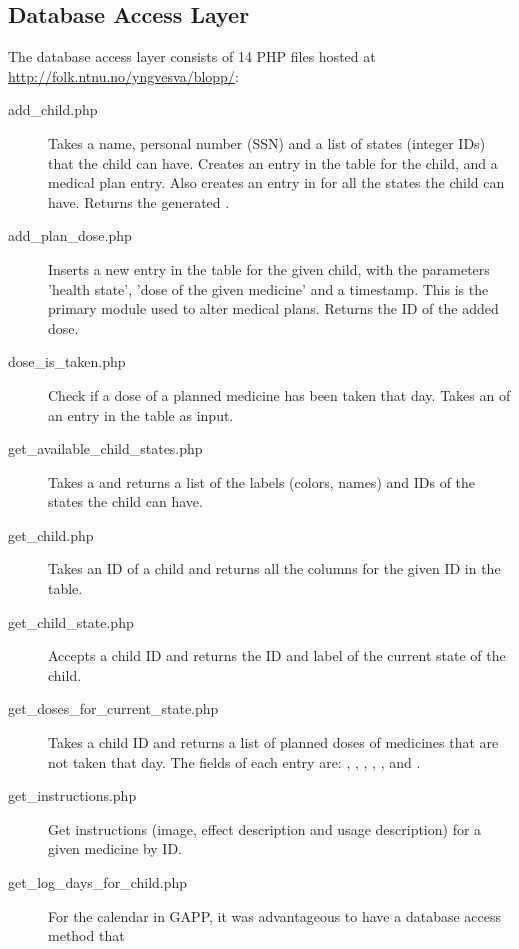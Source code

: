 \subsection{Database Access Layer}
\label{sec:databaseAccessLayer}
The database access layer consists of 14 PHP files hosted at			%
\url{http://folk.ntnu.no/yngvesva/blopp/}:
\begin{description}
    \item[add\_child.php] Takes a name, personal number (SSN) and a list of states (integer IDs) that the child can have. 
    	Creates an entry in the  table for the child, and a medical plan entry. Also creates an entry 
    	in  for all the states the child can have. Returns the generated .
    \item[add\_plan\_dose.php] Inserts a new entry in the  table for the given child, with the parameters 'health state', 'dose of the given medicine' and a timestamp. This is the primary module used to alter medical plans. Returns the ID of the
  		added dose.
    \item[dose\_is\_taken.php] Check if a dose of a planned medicine has been taken that day. Takes an  of an entry in
    	the table  as input.
    \item[get\_available\_child\_states.php] Takes a  and returns a list of the labels (colors, names) and IDs of the 
    	states the child can have.
    \item[get\_child.php] Takes an ID of a child and returns all the columns for the given ID in the  table.
    \item[get\_child\_state.php] Accepts a child ID and returns the ID and label of the current state of the child.
    \item[get\_doses\_for\_current\_state.php] Takes a child ID and returns a list of planned doses of medicines that are not 
    	taken that day. The fields of each entry are: , , , , 
    	,  and .
    \item[get\_instructions.php] Get instructions (image, effect description and usage description) for a given medicine by ID.
    \item[get\_log\_days\_for\_child.php] For the calendar in GAPP, it was advantageous to have a database access method that

\end{description}
